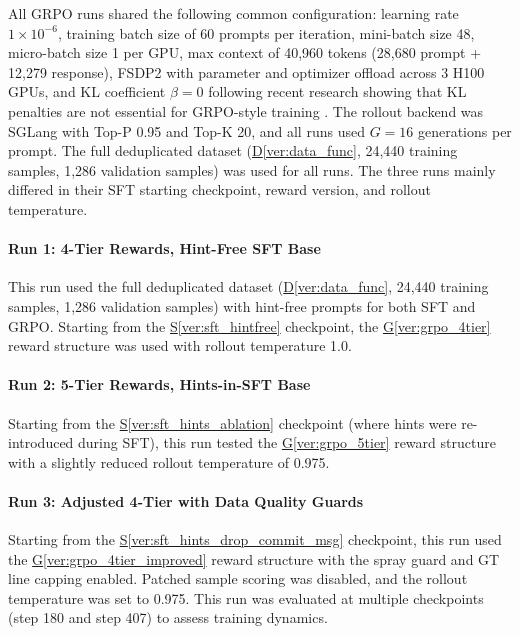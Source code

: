 \documentclass[12pt,a4paper]{article}
\begin{document}
All GRPO runs shared the following common configuration: learning rate $1 \times 10^{-6}$, training batch size of 60 prompts per iteration, mini-batch size 48, micro-batch size 1 per GPU, max context of 40,960 tokens (28,680 prompt + 12,279 response), FSDP2 with parameter and optimizer offload across 3 H100 GPUs, and KL coefficient $\beta = 0$ following recent research showing that KL penalties are not essential for GRPO-style training \cite{dapo, drgrpo}. The rollout backend was SGLang \cite{sglang} with Top-P 0.95 and Top-K 20, and all runs used $G=16$ generations per prompt. The full deduplicated dataset (\hyperref[ver:data_func]{D\ref*{ver:data_func}}, 24,440 training samples, 1,286 validation samples) was used for all runs. The three runs mainly differed in their SFT starting checkpoint, reward version, and rollout temperature.
\paragraph{Run 1: 4-Tier Rewards, Hint-Free SFT Base}
This run used the full deduplicated dataset (\hyperref[ver:data_func]{D\ref*{ver:data_func}}, 24,440 training samples, 1,286 validation samples) with hint-free prompts for both SFT and GRPO. Starting from the \hyperref[ver:sft_hintfree]{S\ref*{ver:sft_hintfree}} checkpoint, the \hyperref[ver:grpo_4tier]{G\ref*{ver:grpo_4tier}} reward structure was used with rollout temperature 1.0.

\paragraph{Run 2: 5-Tier Rewards, Hints-in-SFT Base}
Starting from the \hyperref[ver:sft_hints_ablation]{S\ref*{ver:sft_hints_ablation}} checkpoint (where hints were re-introduced during SFT), this run tested the \hyperref[ver:grpo_5tier]{G\ref*{ver:grpo_5tier}} reward structure with a slightly reduced rollout temperature of 0.975.

\paragraph{Run 3: Adjusted 4-Tier with Data Quality Guards}
Starting from the \hyperref[ver:sft_hints_drop_commit_msg]{S\ref*{ver:sft_hints_drop_commit_msg}} checkpoint, this run used the \hyperref[ver:grpo_4tier_improved]{G\ref*{ver:grpo_4tier_improved}} reward structure with the spray guard and GT line capping enabled. Patched sample scoring was disabled, and the rollout temperature was set to 0.975. This run was evaluated at multiple checkpoints (step 180 and step 407) to assess training dynamics.
\end{document}
